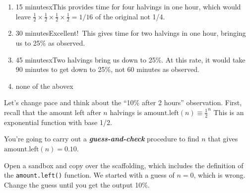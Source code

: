\documentclass[
  letterpaper,
  DIV=11,
  numbers=noendperiod,
  oneside]{article}
\providecommand{\tightlist}{%
  \setlength{\itemsep}{0pt}\setlength{\parskip}{0pt}}\usepackage{longtable,booktabs,array}
\begin{document}
\begin{multicols}{2}
\begin{table}
\begin{minipage}[t]{\linewidth}
{\begin{enumerate}
\def\labelenumi{\roman{enumi}.}
\tightlist
\item
  {15 minutes{xThis provides time for four halvings in one hour, which
  would leave
  \(\frac{1}{2} \times \frac{1}{2} \times \frac{1}{2} \times \frac{1}{2} = 1/16\)
  of the original not 1/4.}}\\
\item
  {30 minutes{Excellent!~This gives time for two halvings in one hour,
  bringing us to 25\% as observed.}}\\
\item
  {45 minutes{xTwo halvings bring us down to 25\%. At this rate, it
  would take 90 minutes to get down to 25\%, not 60 minutes as
  observed.}}\\
\item
  {none of the above{x}}
\end{enumerate}

}

\end{minipage}%
\newline
\begin{minipage}[t]{\linewidth}

{\centering 

Let's change pace and think about the ``10\% after 2 hours''
observation. First, recall that the amount left after \(n\) halvings is
\(\text{amount.left}(n) \equiv \frac{1}{2}^n\) This is an exponential
function with base 1/2.

}

\end{minipage}%
\newline
\begin{minipage}[t]{\linewidth}

{\centering 

You're going to carry out a \textbf{\emph{guess-and-check}} procedure to
find \(n\) that gives \(\text{amount.left}(n) = 0.10\).

}

\end{minipage}%
\newline
\begin{minipage}[t]{\linewidth}

{\centering 

Open a sandbox and copy over the scaffolding, which includes the
definition of the \texttt{amount.left()} function. We started with a
guess of \(n=0\), which is wrong. Change the guess until you get the
output 10\%.

}
\end{minipage}
\end{table}
\end{multicols}
\end{document}
